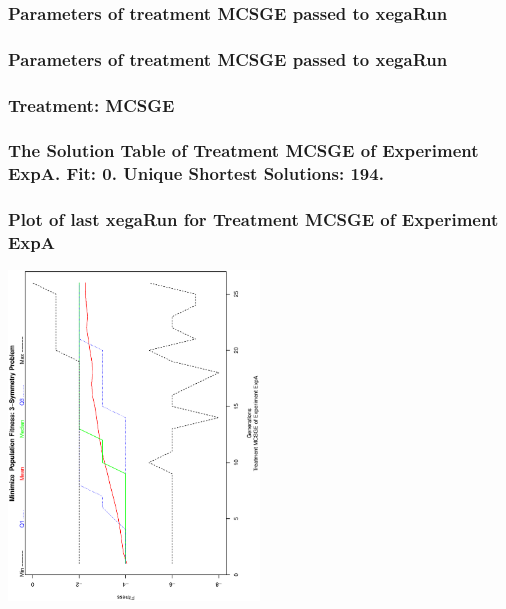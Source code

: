 \documentclass[18pt,c]{beamer}
\begin{document}
 \begin{frame}
 \fontsize{8pt}{9pt}\selectfont
 \frametitle{  Parameters of treatment MCSGE passed to xegaRun
 }

 \label{ExpAtParmTable002.tex}  
 \end{frame}


 \begin{frame}
 \fontsize{8pt}{9pt}\selectfont
 \frametitle{  Parameters of treatment MCSGE passed to xegaRun
 }

 \label{ExpAtParmTable003.tex}  
 \end{frame}

 \begin{frame}
 \fontsize{8pt}{9pt}\selectfont
 \frametitle{ Treatment: MCSGE }

 \label{ExpAStatsTable015.tex}  
 \end{frame}

 \begin{frame}
 \fontsize{8pt}{9pt}\selectfont
 \frametitle{ The Solution Table of Treatment MCSGE of Experiment ExpA. Fit: 0. Unique Shortest Solutions: 194. }

 \label{ExpASolutionTable000.tex}  
 \end{frame}

 \begin{frame}
 \frametitle{ Plot of last xegaRun for Treatment MCSGE of Experiment ExpA }
 \begin{center}
\includegraphics[width=0.5\textwidth, angle=-90]
{ExpAPlotPopStatsFigure000.eps}
 \end{center}
 \label{report/ExpAPlotPopStatsFigure000.eps}  
 \end{frame}
\end{document}
